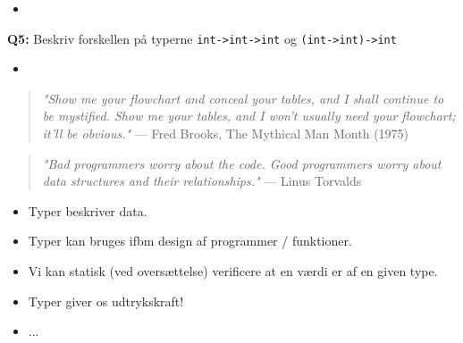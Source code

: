 \documentclass[rgb]{beamer}
\begin{document}
\begin{frame}[fragile]
\begin{footnotesize}
  \begin{itemize}
  \item \underline{\hspace{10cm}}
  \end{itemize}

  \vspace{2mm}
  \textbf{Q5:} Beskriv forskellen på typerne \lstinline{int->int->int} og \lstinline{(int->int)->int}
  \vspace{1mm}

  \begin{itemize}
  \item \underline{\hspace{10cm}}
  \end{itemize}

\end{footnotesize}
\end{frame}

\begin{frame}[fragile]
\begin{footnotesize}


  \vspace{3mm}
  \begin{quote}
    \emph{"Show me your flowchart and conceal your tables, and I shall continue to be mystified. Show me your tables, and I won't usually need your flowchart; it'll be obvious."} --- Fred Brooks, The Mythical Man Month (1975)
  \end{quote}

  \vspace{3mm}
  \begin{quote}
    \emph{"Bad programmers worry about the code. Good programmers worry about data structures and their relationships."} --- Linus Torvalds
  \end{quote}


  \vspace{3mm}
  \begin{itemize}
  \item Typer beskriver data.
  \item Typer kan bruges ifbm design af programmer / funktioner.
  \item Vi kan statisk (ved oversættelse) verificere at en
    værdi er af en given type.
  \item Typer giver os udtrykskraft!
  \item ...
  \end{itemize}
\end{footnotesize}
\end{frame}
\end{document}
